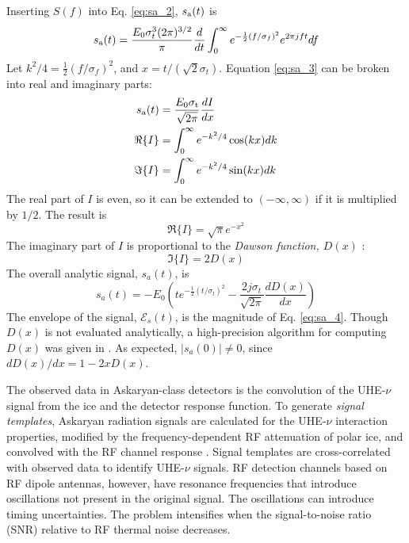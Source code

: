 \documentclass[amsmath,amssymb,aps,prd,10pt,twocolumn,showkeys]{revtex4}
\begin{document}
Inserting $S(f)$ into Eq. \ref{eq:sa_2}, $s_{\rm a}(t)$ is
\begin{equation}
s_{\rm a}(t) = \frac{E_0 \sigma_t^3 (2\pi)^{3/2}}{\pi} \frac{d}{dt}\int_0^{\infty} e^{-\frac{1}{2}\left(f/\sigma_f\right)^2} e^{2\pi j f t} df \label{eq:sa_3}
\end{equation}
 Let $k^2/4 = \frac{1}{2}\left(f/\sigma_f\right)^2$, and $x = t/(\sqrt{2}\sigma_t)$.  Equation \ref{eq:sa_3} can be broken into real and imaginary parts:
\begin{align}
s_{\rm a}(t) &= \frac{E_0 \sigma_{\rm t}}{\sqrt{2\pi}}\frac{dI}{dx} \\
\Re\lbrace I \rbrace &= \int_0^{\infty} e^{-k^2/4}\cos(kx) dk \\
\Im\lbrace I \rbrace &= \int_0^{\infty} e^{-k^2/4}\sin(kx) dk
\end{align}
The real part of $I$ is even, so it can be extended to $(-\infty,\infty)$ if it is multiplied by $1/2$.  The result is
\begin{equation}
\Re\lbrace I \rbrace = \sqrt{\pi} e^{-x^2}
\end{equation}
The imaginary part of $I$ is proportional to the \textit{Dawson function, $D(x)$} \cite{NIST:DLMF}:
\begin{equation}
\Im\lbrace I\rbrace = 2 D(x)
\end{equation}
 The overall analytic signal, $s_a(t)$, is
\begin{equation}
s_a(t) = -E_0 \left(t e^{-\frac{1}{2}\left(t/\sigma_t\right)^2} - \frac{2 j\sigma_t}{\sqrt{2\pi}} \frac{dD(x)}{dx}\right) \label{eq:sa_4}
\end{equation}
The envelope of the signal, $\mathcal{E}_s(t)$, is the magnitude of Eq. \ref{eq:sa_4}.  Though $D(x)$ is not evaluated analytically, a high-precision algorithm for computing $D(x)$ was given in \cite{10.1063/1.4822832}.  As expected, $|s_a(0)| \neq 0$, since $dD(x)/dx = 1 - 2x D(x)$.

The observed data in Askaryan-class detectors is the convolution of the UHE-$\nu$ signal from the ice and the detector response function.  To generate \textit{signal templates}, Askaryan radiation signals are calculated for the UHE-$\nu$ interaction properties, modified by the frequency-dependent RF attenuation of polar ice, and convolved with the RF channel response \cite{10.1016/j.astropartphys.2014.09.002,10.3189/2015jog14j214}.  Signal templates are cross-correlated with observed data to identify UHE-$\nu$ signals.  RF detection channels based on RF dipole antennas, however, have resonance frequencies that introduce oscillations not present in the original signal.  The oscillations can introduce timing uncertainties.  The problem intensifies when the signal-to-noise ratio (SNR) relative to RF thermal noise decreases.
\end{document}
